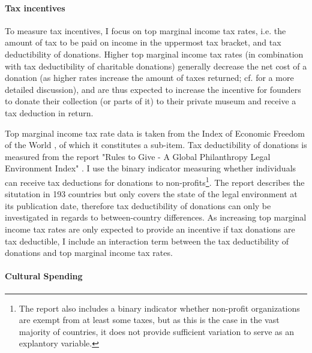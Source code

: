 \documentclass[11pt, authoryear]{elsarticle}
\begin{document}
\paragraph*{Tax incentives}

To measure tax incentives, I focus on top marginal income tax rates, i.e. the amount of tax to be paid on income in the uppermost tax bracket, and tax deductibility of donations.
Higher top marginal income tax rates (in combination with tax deductibility of charitable donations) generally decrease the net cost of a donation (as higher rates increase the amount of taxes returned; cf. \citealt{Hemels_2017_incentives} for a more detailed discussion), and are thus expected to increase the incentive for founders to donate their collection (or parts of it) to their private museum and receive a tax deduction in return. 


Top marginal income tax rate data is taken from the Index of Economic Freedom of the World \citep{Fraser_2022_economic_freedom}, of which it constitutes a sub-item.
Tax deductibility of donations is measured from the report "Rules to Give - A Global Philanthropy Legal Environment Index" \citep{Quick_Kruse_Pickering_2014_philanthropy}.
I use the binary indicator measuring whether individuals can receive tax deductions for donations to non-profits\footnote{The report also includes a binary indicator whether non-profit organizations are exempt from at least some taxes, but as this is the case in the vast majority of countries, it does not provide sufficient variation to serve as an explantory variable.}.
The report describes the situtation in 193 countries but only covers the state of the legal environment at its publication date, therefore tax deductibility of donations can only be investigated in regards to between-country differences.
As increasing top marginal income tax rates are only expected to provide an incentive if tax donations are tax deductible, I include an interaction term between the tax deductibility of donations and top marginal income tax rates. 

\paragraph*{Cultural Spending}
\end{document}
